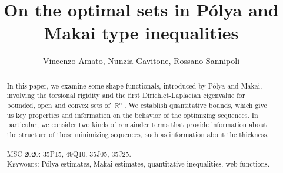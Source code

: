 \documentclass[oneside,a4paper,11pt,notitlepage]{article}
\title{On the optimal sets in P\'olya and Makai type inequalities}
\author{Vincenzo Amato, Nunzia Gavitone, Rossano Sannipoli}
\date{}
\theoremstyle{definition}
\theoremstyle{plain}
\theoremstyle{definition}
\DeclareMathOperator{\R}{\mathbb{R}}
\begin{document}
\maketitle

\begin{abstract} 
  In this paper, we examine some shape functionals, introduced by P\'olya and Makai, involving the torsional rigidity and the first Dirichlet-Laplacian eigenvalue for bounded, open and convex sets of $\R^n$. We establish quantitative bounds, which give us key properties and information on the behavior of the optimizing sequences.
In particular, we consider two kinds of remainder terms that provide information about the structure of these minimizing sequences, such as information about the thickness.  \\ \\
\textsc{MSC 2020:}   35P15, 49Q10, 35J05, 35J25.\\
\textsc{Keywords:} P\'olya estimates, Makai estimates, quantitative inequalities, web functions.

\end{abstract}
\end{document}
